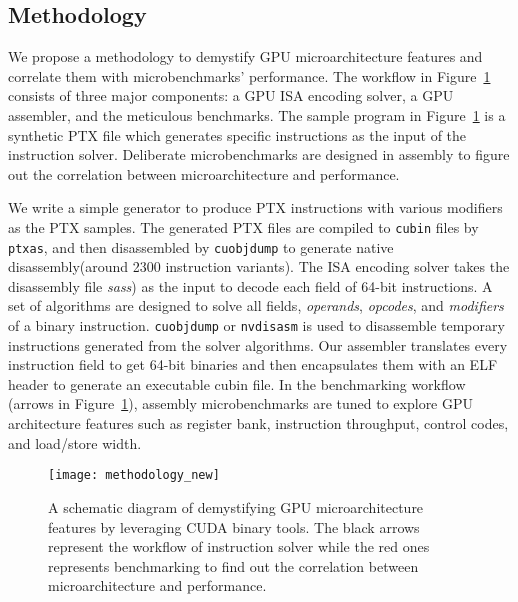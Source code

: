 \subsection{Methodology}


We propose a methodology to demystify GPU microarchitecture features and correlate them with microbenchmarks' performance.
The workflow in Figure~\ref{fig:workflow} consists of three major components: a GPU ISA encoding solver, a GPU assembler, and the meticulous benchmarks.
The sample program in Figure~\ref{fig:workflow} is a synthetic PTX file which generates specific instructions as the input of the instruction solver.
Deliberate microbenchmarks are designed in assembly to figure out the correlation between microarchitecture and performance.

We write a simple generator to produce PTX instructions with various modifiers as the PTX samples.
The generated PTX files are compiled to {\tt cubin} files by {\tt ptxas}, and
then disassembled by {\tt cuobjdump} to generate native disassembly(around 2300 instruction variants). 
The ISA encoding solver takes the disassembly file {\em sass}) as the input to decode each field of 64-bit instructions.
A set of algorithms are designed to solve all fields, {\em operands}, {\em opcodes}, and {\em modifiers} of a binary instruction.
{\tt cuobjdump} or {\tt nvdisasm} is used to disassemble temporary instructions generated from the solver algorithms.
Our assembler translates every instruction field to get 64-bit binaries and then encapsulates them with an ELF header to generate an executable cubin file.
In the benchmarking workflow (arrows in Figure~\ref{fig:workflow}), assembly microbenchmarks are tuned to explore GPU architecture features such as register bank, instruction throughput, control codes, and load/store width.


\begin{figure}[htbp]
\begin{center}
    \texttt{[image: methodology\_new]}
\caption{\small A schematic diagram of demystifying GPU microarchitecture features by leveraging CUDA binary tools. The black arrows
    represent the workflow of instruction solver while the red ones represents benchmarking to find out the correlation between microarchitecture and performance.}
\label{fig:workflow}
\end{center}
\end{figure}
